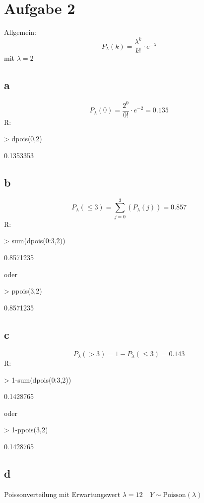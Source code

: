 

\section{Aufgabe 2}
Allgemein: 
\[ P_{\lambda}(k) = \frac{\lambda^k}{k!} \cdot e^{-\lambda} \]
mit $\lambda = 2$

\subsection{a}
\[ P_{\lambda}(0) = \frac{2^0}{0!} \cdot e^{-2} = 0.135 \]
R:
\begin{Schunk}
\begin{Sinput}
> dpois(0,2)
\end{Sinput}
\begin{Soutput}
[1] 0.1353353
\end{Soutput}
\end{Schunk}

\subsection{b}
\[ P_{\lambda}(\leq3) = \sum_{j=0}^{3}(P_{\lambda}(j)) = 0.857 \]
R:
\begin{Schunk}
\begin{Sinput}
> sum(dpois(0:3,2))
\end{Sinput}
\begin{Soutput}
[1] 0.8571235
\end{Soutput}
\end{Schunk}
oder
\begin{Schunk}
\begin{Sinput}
> ppois(3,2)
\end{Sinput}
\begin{Soutput}
[1] 0.8571235
\end{Soutput}
\end{Schunk}

\subsection{c}
\[ P_{\lambda}(>3) = 1 - P_{\lambda}(\leq3) = 0.143 \]
R:
\begin{Schunk}
\begin{Sinput}
> 1-sum(dpois(0:3,2))
\end{Sinput}
\begin{Soutput}
[1] 0.1428765
\end{Soutput}
\end{Schunk}
oder
\begin{Schunk}
\begin{Sinput}
> 1-ppois(3,2)
\end{Sinput}
\begin{Soutput}
[1] 0.1428765
\end{Soutput}
\end{Schunk}

\subsection{d}
Poissonverteilung mit Erwartungswert $\lambda 
= 12 \quad Y \sim \text{Poisson}(\lambda)$
